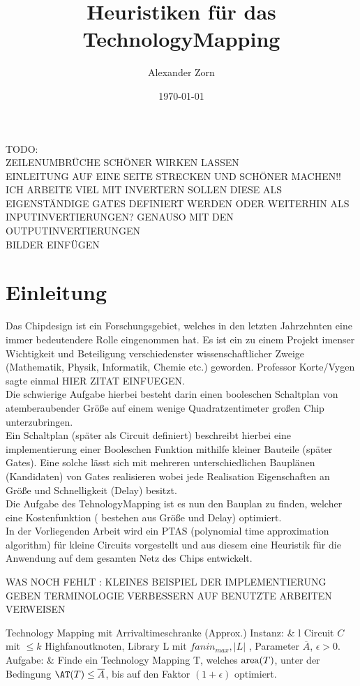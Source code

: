 \documentclass[11pt, a4paper, german]{article}
\author{Alexander Zorn}
\date{\today}
\title{Heuristiken f\"ur das TechnologyMapping}
\newcommand{\TM}{TehnologyMapping }
\begin{document}
\maketitle

\tableofcontents
\newpage

TODO: \\
ZEILENUMBRÜCHE SCHÖNER WIRKEN LASSEN\\
EINLEITUNG AUF EINE SEITE STRECKEN UND SCHÖNER MACHEN!!\\
ICH ARBEITE VIEL MIT INVERTERN SOLLEN DIESE ALS EIGENSTÄNDIGE GATES DEFINIERT WERDEN ODER WEITERHIN ALS INPUTINVERTIERUNGEN? GENAUSO MIT DEN OUTPUTINVERTIERUNGEN\\
BILDER EINFÜGEN


\section{Einleitung}


Das Chipdesign ist ein Forschungsgebiet, welches in den letzten Jahrzehnten eine immer bedeutendere Rolle eingenommen hat. Es ist ein zu einem Projekt imenser Wichtigkeit und Beteiligung verschiedenster wissenschaftlicher Zweige (Mathematik, Physik, Informatik, Chemie etc.) geworden. 
Professor Korte/Vygen sagte einmal HIER ZITAT EINFUEGEN. \\
Die schwierige Aufgabe hierbei besteht darin einen booleschen Schaltplan von atemberaubender Größe auf einem wenige Quadratzentimeter großen Chip unterzubringen.  \\
Ein Schaltplan (später als Circuit definiert) beschreibt hierbei eine implementierung einer Booleschen Funktion mithilfe kleiner Bauteile (später Gates). Eine solche lässt sich mit mehreren unterschiedlichen Bauplänen (Kandidaten) von Gates realisieren wobei jede Realisation Eigenschaften an Größe und Schnelligkeit (Delay) besitzt. \\
Die Aufgabe des \TM  ist es nun den Bauplan zu finden, welcher eine Kostenfunktion ( bestehen aus Größe und Delay) optimiert. \\
In der Vorliegenden Arbeit wird ein PTAS (polynomial time approximation algorithm) für kleine Circuits vorgestellt und aus diesem eine Heuristik für die Anwendung auf dem gesamten Netz des Chips entwickelt.

WAS NOCH FEHLT : KLEINES BEISPIEL DER IMPLEMENTIERUNG GEBEN 
TERMINOLOGIE VERBESSERN 
AUF BENUTZTE ARBEITEN VERWEISEN

\begin{pproblem}[framed]{Technology Mapping mit Arrivaltimeschranke (Approx.)}
 Instanz: &  l Circuit $C$ mit $\leq k$ Highfanoutknoten, Library L mit $fanin_{max}, |L|$ , Parameter $\overline{A}$, $\epsilon > 0$.\\
 \small Aufgabe: & Finde ein Technology Mapping T, welches $\text{area}(T)$, unter der Bedingung $\AT(T) \leq \overline{A}$, bis auf den Faktor $(1+\epsilon)$ optimiert.
\end{pproblem}
\end{document}
